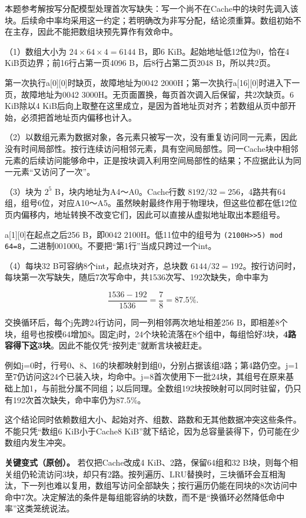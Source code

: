 本题参考解按写分配模型处理首次写缺失：写一个尚不在Cache中的块时先调入该块。后续命中率均采用这一约定；若明确改为非写分配，结论须重算。数组初始不在主存，因此不能把数组块预先算作有效命中。

（1）数组大小为 \(24\times64\times4=6144\) B，即6 KiB。起始地址低12位为0，恰在4 KiB页边界；前16行占第一页4096 B，后8行占第二页2048 B，所以共2页。

第一次执行a{[}0{]}{[}0{]}时缺页，故障地址为0042 2000H；第一次执行a{[}16{]}{[}0{]}时进入下一页，故障地址为0042 3000H。无页面置换，每页首次调入后保留，共2次缺页。6 KiB除以4 KiB后向上取整在这里成立，是因为首地址页对齐；若数组从页中部开始，必须把首地址页内偏移也计入。

（2）以数组元素为数据对象，各元素只被写一次，没有重复访问同一元素，因此没有时间局部性。按行连续访问相邻元素，具有空间局部性。同一Cache块中相邻元素的后续访问能够命中，正是按块调入利用空间局部性的结果；不应据此认为同一元素``又访问了一次''。

（3）块为 \(2^5\) B，块内地址为A4～A0。Cache行数 \(8192/32=256\)，4路共有64组，组号6位，对应A10～A5。虽然映射最终作用于物理块，但这些位都在低12位页内偏移内，地址转换不改变它们，因此可以直接从虚拟地址取出本题组号。

a{[}1{]}{[}0{]}在起点之后256 B，即0042 2100H。低11位中的组号为 \texttt{(\allowbreak{}2100H>\allowbreak{}>\allowbreak{}5)\allowbreak{} mod 64=\allowbreak{}8}，二进制001000。不要把``第1行''当成只跨过一个int。

（4）每块32 B可容纳8个int，起点块对齐，总块数 \(6144/32=192\)。按行访问时，每块第一次写缺失，随后7次写命中，共1536次写、192次缺失，命中率为

\[
\frac{1536-192}{1536}=\frac78=87.5\%.
\]

交换循环后，每个j先跨24行访问，同一列相邻两次地址相差256 B，即相差8个块，组号也按模64增加8。固定j时，24个块轮流落在8个组中，每组恰好3块，\textbf{4路容得下这3块}。因此不能仅凭``按列走''就断言块被赶走。

例如j=0时，行号0、8、16的块都映射到组0，分别占据该组3路；第4路仍空。j=1至7仍访问这24个已装入块，均命中。j=8首次使用下一批24块，其组号在原来基础上加1，与前批分属不同组；以后同理。全数组192块按映射可以同时驻留，仍只有192次首次缺失，命中率仍为87.5\%。

这个结论同时依赖数组大小、起始对齐、组数、路数和无其他数据冲突这些条件。不能只凭``数组6 KiB小于Cache8 KiB''就下结论，因为总容量装得下，仍可能在少数组内发生冲突。

\textbf{关键变式（原创）。} 若仅把Cache改成4 KiB、2路，保留64组和32 B块，则每个相关组仍轮流访问3块，却只有2路。按列遍历、LRU替换时，三块循环会互相淘汰，下一列也难以复用，数组写访问全部缺失；按行遍历仍能在同块的8次访问中命中7次。决定解法的条件是每组能容纳的块数，而不是``换循环必然降低命中率''这类笼统说法。

